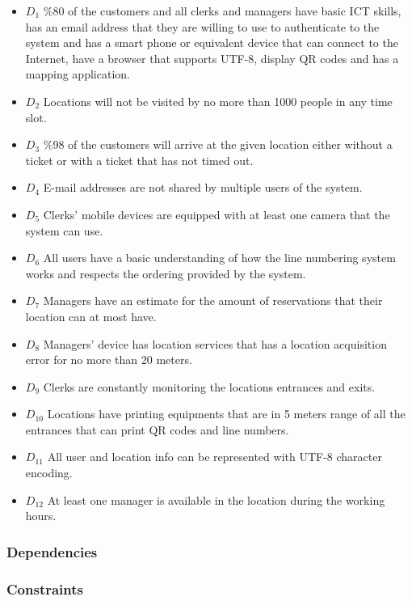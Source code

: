 \begin{itemize}
    \item \textbf{$D_1$} \%80 of the customers and all clerks and managers have basic ICT skills, has an email address that they are willing to use to authenticate to the system and has a smart phone or equivalent device that can connect to the Internet, have a browser that supports UTF-8, display QR codes and has a mapping application. %
    \item \textbf{$D_2$} Locations will not be visited by no more than 1000 people in any time slot. %
    \item \textbf{$D_3$} \%98 of the customers will arrive at the given location either without a ticket or with a ticket that has not timed out. %
    \item \textbf{$D_4$} E-mail addresses are not shared by multiple users of the system. %
    \item \textbf{$D_5$} Clerks' mobile devices are equipped with at least one camera that the system can use. %
    \item \textbf{$D_6$} All users have a basic understanding of how the line numbering system works and respects the ordering provided by the system. %
    \item \textbf{$D_7$} Managers have an estimate for the amount of reservations that their location can at most have. %
    \item \textbf{$D_8$} Managers' device has location services that has a location acquisition error for no more than 20 meters. %
    \item \textbf{$D_9$} Clerks are constantly monitoring the locations entrances and exits. %
    \item \textbf{$D_{10}$} Locations have printing equipments that are in 5 meters range of all the entrances that can print QR codes and line numbers. %
    \item \textbf{$D_{11}$} All user and location info can be represented with UTF-8 character encoding. %
    \item \textbf{$D_{12}$} At least one manager is available in the location during the working hours. %
\end{itemize}
\subsubsection{Dependencies}
\subsubsection{Constraints}
